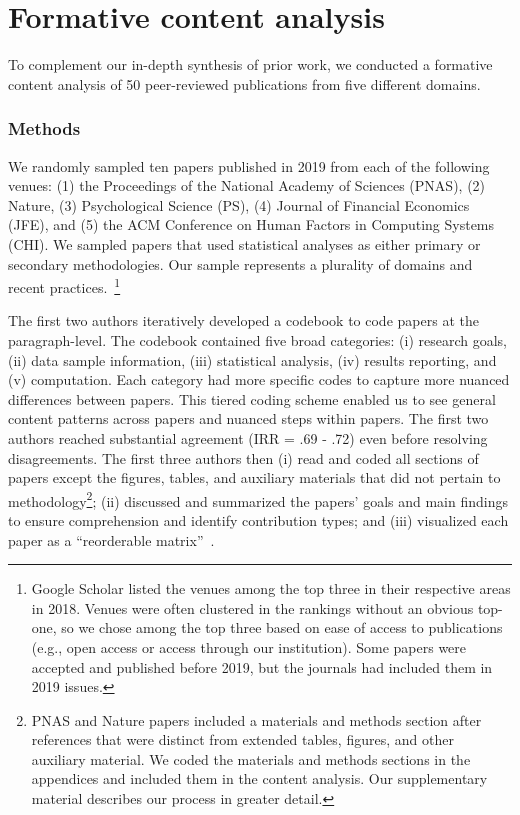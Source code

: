 \section{Formative content analysis} \label{sec:litSurvey} 
To complement our in-depth synthesis of prior work, we conducted a formative
content analysis of 50 peer-reviewed publications from five different domains. 

\subsubsection{Methods}
We randomly sampled ten papers published in 2019 from each of the following
venues: (1) the Proceedings of the National Academy of Sciences (PNAS), (2)
Nature, (3) Psychological Science (PS), (4) Journal of Financial Economics
(JFE), and (5) the ACM Conference on Human Factors in Computing Systems (CHI).
We sampled papers that used statistical analyses as either primary or secondary
methodologies. Our sample represents a plurality of domains and recent
practices.~\footnote{Google Scholar listed the venues among the top three in
their respective areas in 2018. Venues were often clustered in the rankings
without an obvious top-one, so we chose among the top three based on ease of
access to publications (e.g., open access or access through our institution).
Some papers were accepted and published before 2019, but the journals had
included them in 2019 issues.}


The first two authors iteratively developed a codebook to code papers at the
paragraph-level. The codebook contained five broad categories: (i) research
goals, (ii) data sample information, (iii) statistical analysis, (iv) results
reporting, and (v) computation. Each category had more specific codes to capture
more nuanced differences between papers. This tiered coding scheme enabled us to
see general content patterns across papers and nuanced steps within papers. The
first two authors reached substantial agreement (IRR = .69 - .72) even before
resolving disagreements. The first three authors then (i) read and coded all
sections of papers except the figures, tables, and auxiliary materials that did
not pertain to methodology\footnote{PNAS and Nature papers included a materials
and methods section after references that were distinct from extended tables,
figures, and other auxiliary material. We coded the materials and methods
sections in the appendices and included them in the content analysis. Our
supplementary material describes our process in greater detail.}; (ii) discussed
and summarized the papers' goals and main findings to ensure comprehension and
identify contribution types; and (iii) visualized each paper as a ``reorderable
matrix''~\cite{bertin2011graphics}. 

